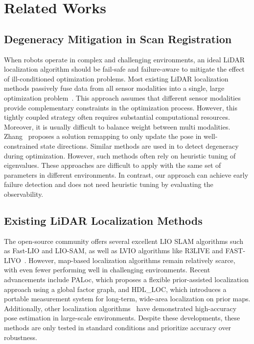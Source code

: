 \section{Related Works}
\subsection{Degeneracy Mitigation in Scan Registration}
When robots operate in complex and challenging environments, an ideal LiDAR localization algorithm should be fail-safe and failure-aware to mitigate the effect of ill-conditioned optimization problems.
Most existing LiDAR localization methods passively fuse data from all sensor modalities into a single, large optimization problem~\cite{zheng2022fast,lin2022r}. This approach assumes that different sensor modalities provide complementary constraints in the optimization process. However, this tightly coupled strategy often requires substantial computational resources. Moreover, it is usually difficult to balance weight between multi modalities.
Zhang~\cite{zhang2016degeneracy} proposes a solution remapping to only update the pose in well-constrained state directions. Similar methods are used in\cite{hinduja2019degeneracy}\cite{nubert2022learning} to detect degeneracy during optimization. However, such methods often rely on heuristic tuning of eigenvalues. These approaches are difficult to apply with the same set of parameters in different environments. In contrast, our approach can achieve early failure detection and does not need heuristic tuning by evaluating the observability. 
\subsection{Existing LiDAR Localization Methods}
The open-source community offers several excellent LIO SLAM algorithms such as Fast-LIO\cite{xu2021fast} and LIO-SAM\cite{shan2020lio}, as well as LVIO algorithms like R3LIVE\cite{lin2022r} and FAST-LIVO~\cite{zheng2022fast}. However, map-based localization algorithms remain relatively scarce, with even fewer performing well in challenging environments. Recent advancements include PALoc\cite{hu2024paloc}, which proposes a flexible prior-assisted localization approach using a global factor graph, and HDL\_LOC\cite{koide2019portable}, which introduces a portable measurement system for long-term, wide-area localization on prior maps. Additionally, other localization algorithms~\cite{koide2024tightly,chen2023dliom} have demonstrated high-accuracy pose estimation in large-scale environments. Despite these developments, these methods are only tested in standard conditions and prioritize accuracy over robustness.

